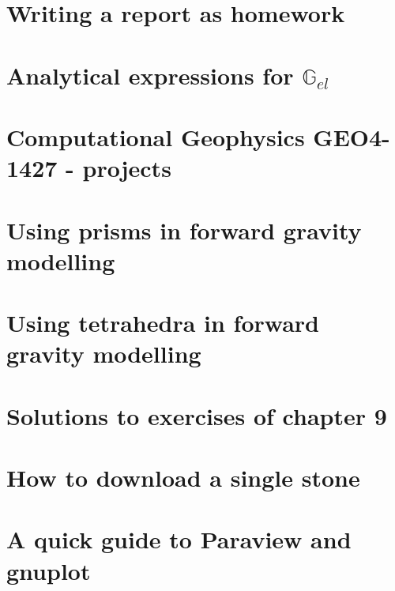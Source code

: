 \documentclass[a4paper]{article}
\numberwithin{equation}{section}
\newcommand{\G}{{\mathbb{G}}}
\begin{document}
\section{Writing a report as homework} %
\newpage %
\section{Analytical expressions for $\G_{el}$} \label{app:Gel} %
\newpage %
\section{Computational Geophysics GEO4-1427 - projects}  %
\newpage %
\section{Using prisms in forward gravity modelling \label{app:prisms}} 
\newpage %
\section{Using tetrahedra in forward gravity modelling} \label{app:tetra} 
\newpage %
\section{Solutions to exercises of chapter 9 \label{app:gravsols}}  %
\newpage %
\section{How to download a single stone}  %
\newpage %
\section{A quick guide to Paraview and gnuplot} %
\newpage %
\end{document}
